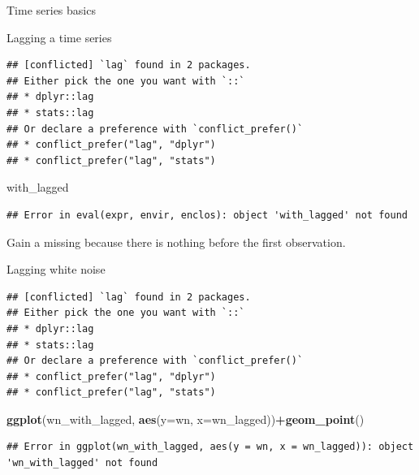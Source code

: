 \documentclass[ignorenonframetext,]{beamer}
\newenvironment{Shaded}{\begin{snugshade}}{\end{snugshade}}
\newcommand{\DataTypeTok}[1]{\textcolor[rgb]{0.13,0.29,0.53}{#1}}
\newcommand{\KeywordTok}[1]{\textcolor[rgb]{0.13,0.29,0.53}{\textbf{#1}}}
\newcommand{\NormalTok}[1]{#1}
\newcommand{\OperatorTok}[1]{\textcolor[rgb]{0.81,0.36,0.00}{\textbf{#1}}}
\newcommand{\StringTok}[1]{\textcolor[rgb]{0.31,0.60,0.02}{#1}}
\begin{document}
\begin{frame}[fragile]{Time series basics}
\begin{block}{Lagging a time series}
\begin{verbatim}
## [conflicted] `lag` found in 2 packages.
## Either pick the one you want with `::` 
## * dplyr::lag
## * stats::lag
## Or declare a preference with `conflict_prefer()`
## * conflict_prefer("lag", "dplyr")
## * conflict_prefer("lag", "stats")
\end{verbatim}

\begin{Shaded}
\begin{Highlighting}[]
\NormalTok{with_lagged}
\end{Highlighting}
\end{Shaded}

\begin{verbatim}
## Error in eval(expr, envir, enclos): object 'with_lagged' not found
\end{verbatim}

Gain a missing because there is nothing before the first observation.

Lagging white noise

\begin{Shaded}
\end{Shaded}

\begin{verbatim}
## [conflicted] `lag` found in 2 packages.
## Either pick the one you want with `::` 
## * dplyr::lag
## * stats::lag
## Or declare a preference with `conflict_prefer()`
## * conflict_prefer("lag", "dplyr")
## * conflict_prefer("lag", "stats")
\end{verbatim}

\begin{Shaded}
\begin{Highlighting}[]
\KeywordTok{ggplot}\NormalTok{(wn_with_lagged, }\KeywordTok{aes}\NormalTok{(}\DataTypeTok{y=}\NormalTok{wn, }\DataTypeTok{x=}\NormalTok{wn_lagged))}\OperatorTok{+}\KeywordTok{geom_point}\NormalTok{()}
\end{Highlighting}
\end{Shaded}

\begin{verbatim}
## Error in ggplot(wn_with_lagged, aes(y = wn, x = wn_lagged)): object 'wn_with_lagged' not found
\end{verbatim}


\end{block}
\end{frame}
\end{document}
